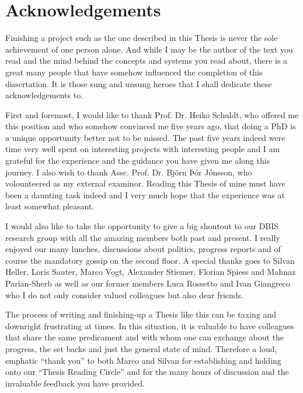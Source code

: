 
\chapter{Acknowledgements}

Finishing a project such as the one described in this Thesis is never the sole achievement of one person alone. And while I may be the author of the text you read and the mind behind the concepts and systems you read about, there is a great many people that have somehow influenced the completion of this dissertation. It is those sung and unsung heroes that I shall dedicate these acknowledgements to.

First and foremost, I would like to thank Prof. Dr. Heiko Schuldt, who offered me this position and who somehow convinced me five years ago, that doing a PhD is a unique opportunity better not to be missed. The past five years indeed were time very well spent on interesting projects with interesting people and I am grateful for the experience and the guidance you have given me along this journey. I also wish to thank Assc. Prof. Dr. Björn Þór Jónsson, who volounteered as my external examinor. Reading this Thesis of mine must have been a daunting task indeed and I very much hope that the experience was at least somewhat pleasant.

I would also like to take the opportunity to give a big shoutout to our DBIS research group with all the amazing members both past and present. I really enjoyed our many lunches, discussions about politics, progress reports and of course the mandatory gossip on the second floor. A special thanks goes to Silvan Heller, Loris Sauter, Marco Vogt, Alexander Stiemer, Florian Spiess and Mahnaz Parian-Sherb as well as our former members Luca Rossetto and Ivan Giangreco who I do not only consider valued colleagues but also dear friends.  

The process of writing and finishing-up a Thesis like this can be taxing and downright frustrating at times. In this situation, it is valuable to have colleagues that share the same predicament and with whom one can exchange about the progress, the set backs and just the general state of mind. Therefore a loud, emphatic ``thank you'' to both Marco and Silvan for establishing and holding onto our ``Thesis Reading Circle'' and for the many hours of discussion and the invaluable feedback you have provided.

